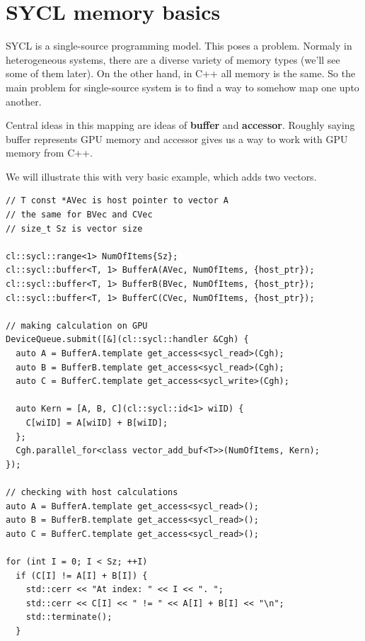 \documentclass[a4paper,12pt,oneside]{article}
\begin{document}
\section{SYCL memory basics}\label{sec:Basics}


SYCL is a single-source programming model. This poses a problem. Normaly in heterogeneous systems, there are a diverse variety of memory types (we'll see some of them later). On the other hand, in C++ all memory is the same. So the main problem for single-source system is to find a way to somehow map one upto another.

Central ideas in this mapping are ideas of \textbf{buffer} and \textbf{accessor}. Roughly saying buffer represents GPU memory and accessor gives us a way to work with GPU memory from C++.

We will illustrate this with very basic example, which adds two vectors.

\begin{lstlisting}[caption={Vector addition with SYCL buffers},label={lst:vectoradd}]
// T const *AVec is host pointer to vector A
// the same for BVec and CVec
// size_t Sz is vector size

cl::sycl::range<1> NumOfItems{Sz};
cl::sycl::buffer<T, 1> BufferA(AVec, NumOfItems, {host_ptr});
cl::sycl::buffer<T, 1> BufferB(BVec, NumOfItems, {host_ptr});
cl::sycl::buffer<T, 1> BufferC(CVec, NumOfItems, {host_ptr});

// making calculation on GPU
DeviceQueue.submit([&](cl::sycl::handler &Cgh) {
  auto A = BufferA.template get_access<sycl_read>(Cgh);
  auto B = BufferB.template get_access<sycl_read>(Cgh);
  auto C = BufferC.template get_access<sycl_write>(Cgh);

  auto Kern = [A, B, C](cl::sycl::id<1> wiID) {
    C[wiID] = A[wiID] + B[wiID];
  };
  Cgh.parallel_for<class vector_add_buf<T>>(NumOfItems, Kern);
});

// checking with host calculations
auto A = BufferA.template get_access<sycl_read>();
auto B = BufferB.template get_access<sycl_read>();
auto C = BufferC.template get_access<sycl_read>();

for (int I = 0; I < Sz; ++I)
  if (C[I] != A[I] + B[I]) {
    std::cerr << "At index: " << I << ". ";
    std::cerr << C[I] << " != " << A[I] + B[I] << "\n";
    std::terminate();
  }
\end{lstlisting}
\end{document}
